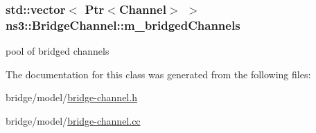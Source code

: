 \subsubsection[{\texorpdfstring{m\+\_\+bridged\+Channels}{m_bridgedChannels}}]{\setlength{\rightskip}{0pt plus 5cm}std\+::vector$<$ {\bf Ptr}$<${\bf Channel}$>$ $>$ ns3\+::\+Bridge\+Channel\+::m\+\_\+bridged\+Channels\hspace{0.3cm}{\ttfamily [private]}}\hypertarget{classns3_1_1BridgeChannel_a2676f0c161f4b53635ae5a4e2e0d356d}{}\label{classns3_1_1BridgeChannel_a2676f0c161f4b53635ae5a4e2e0d356d}


pool of bridged channels 



The documentation for this class was generated from the following files\+:\begin{DoxyCompactItemize}
\item 
bridge/model/\hyperlink{bridge-channel_8h}{bridge-\/channel.\+h}\item 
bridge/model/\hyperlink{bridge-channel_8cc}{bridge-\/channel.\+cc}\end{DoxyCompactItemize}
